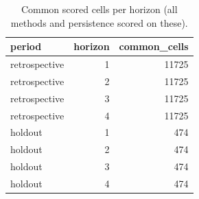 \begin{table}[t]
\centering
\small
\caption{Common scored cells per horizon (all methods and persistence scored on these).}
\label{tab:coverage}
\begin{tabular}{lrr}
\toprule
period & horizon & common\_cells \\
\midrule
retrospective & 1 & 11725 \\
retrospective & 2 & 11725 \\
retrospective & 3 & 11725 \\
retrospective & 4 & 11725 \\
holdout & 1 & 474 \\
holdout & 2 & 474 \\
holdout & 3 & 474 \\
holdout & 4 & 474 \\
\bottomrule
\end{tabular}
\end{table}
